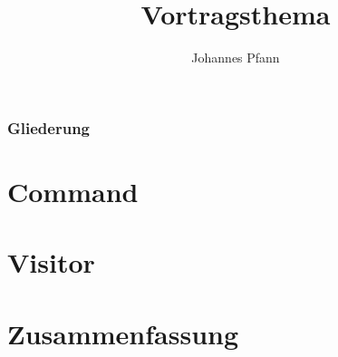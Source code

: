 \documentclass[compress]{beamer}
\author[Pfann]{%
  Johannes Pfann
}
\date{}
\institute[FAU Erlangen-Nürnberg]{
  Lehrstuhl für Software Engineering\\
  Friedrich-Alexander-Universität Erlangen-Nürnberg
}
\title{Vortragsthema}
\begin{document}
\frame{\titlepage} 

\begin{frame}
	\frametitle{Gliederung}
	\tableofcontents[hideallsubsections]
\end{frame}



%

\section[Command]{Command}


\section[Visitor]{Visitor}


\section[Zusammenfassung]{Zusammenfassung}



\end{document}
